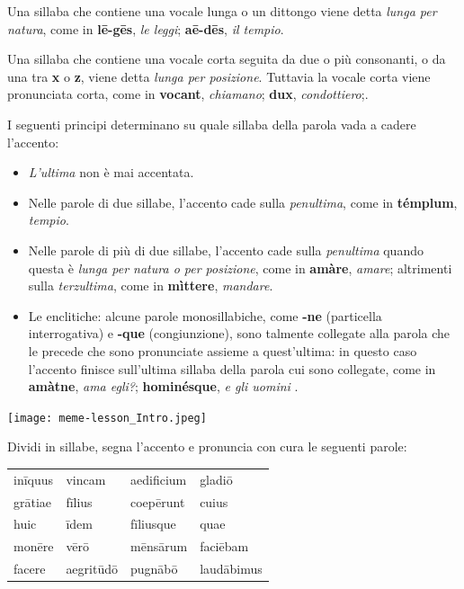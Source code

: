 \documentclass[nols]{tufte-handout}
\newcommand{\textls}[2][5]{%
    \begingroup\addfontfeatures{LetterSpace=#1}#2\endgroup
  }
\renewcommand{\smallcapsspacing}[1]{\textls[10]{#1}}
\renewcommand{\textsc}[1]{\smallcapsspacing{\textsmallcaps{#1}}}
\begin{document}
 Una sillaba che contiene una vocale lunga o un dittongo viene detta \textit{lunga per natura}, come in \textbf{lē-gēs}, \textit{le leggi}; \textbf{aē-dēs}, \textit{il tempio}. 

 Una sillaba che contiene una vocale corta seguita da due o più consonanti, o da una tra \textbf{x} o \textbf{z}, viene detta \textit{lunga per posizione}. Tuttavia la vocale corta viene pronunciata corta, come in  \textbf{vocant}, \textit{chiamano}; \textbf{dux}, \textit{condottiero};. 

 I seguenti principi determinano su quale sillaba della parola vada a cadere l'accento:
\begin{itemize}
\item[\textsc{1.}] \textit{L'ultima} non è mai accentata. 
\item[\textsc{2.}] Nelle parole di due sillabe, l'accento cade sulla \textit{penultima}, come in \textbf{témplum}, \textit{tempio}. 
\item[\textsc{3.}] Nelle parole di più di due sillabe, l'accento cade sulla \textit{penultima} quando questa è \textit{lunga per natura o per posizione}, come in \textbf{amàre}, \textit{amare}; altrimenti sulla \textit{terzultima}, come in \textbf{mìttere}, \textit{mandare}.  
\item[\textsc{4.}] Le enclitiche: alcune parole monosillabiche, come \textbf{-ne} (particella interrogativa) e \textbf{-que} (congiunzione), sono talmente collegate alla parola che le precede che sono pronunciate assieme a quest'ultima: in questo caso l'accento finisce sull'ultima sillaba della parola cui sono collegate, come in \textbf{amàtne}, \textit{ama egli?}; \textbf{hominésque}, \textit{e gli uomini} . 
\end{itemize} 

\begin{marginfigure}
\texttt{[image: meme-lesson\_Intro.jpeg]}
\end{marginfigure}



 Dividi in sillabe, segna l'accento e pronuncia con cura le seguenti parole:
\begin{fullwidth}
\begin{table}[!htbp]
  \centering
  \begin{tabular}{l l l l}
	inīquus & vincam & aedificium & gladiō \\
	grātiae & fīlius & coepērunt & cuius \\
	huic & īdem & fīliusque & quae \\
	monēre & vērō & mēnsārum & faciēbam \\
	facere & aegritūdō & pugnābō & laudābimus \\
  \end{tabular}
  \label{tab:normaltab}
\end{table}
\end{fullwidth}
\end{document}
